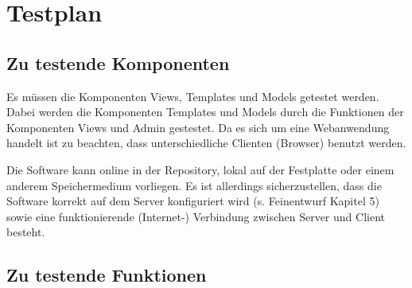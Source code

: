 
\chapter{Testplan}

\section{Zu testende Komponenten}


Es müssen die Komponenten Views, Templates und Models getestet werden.
Dabei werden die Komponenten Templates und Models durch die Funktionen der
Komponenten Views und Admin gestestet. Da es sich um eine Webanwendung handelt
ist zu beachten, dass unterschiedliche Clienten (Browser) benutzt werden.

Die Software kann online in der Repository, lokal auf der Festplatte oder einem
anderem Speichermedium vorliegen. Es ist allerdings sicherzustellen, dass die
Software korrekt auf dem Server konfiguriert wird (s. Feinentwurf Kapitel 5)
sowie eine funktionierende (Internet-) Verbindung zwischen Server und Client
besteht.

\section{Zu testende Funktionen}

